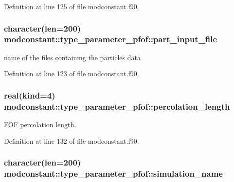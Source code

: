 Definition at line 125 of file modconstant.\+f90.

\subsubsection[{\texorpdfstring{part\+\_\+input\+\_\+file}{part_input_file}}]{\setlength{\rightskip}{0pt plus 5cm}character(len=200) modconstant\+::type\+\_\+parameter\+\_\+pfof\+::part\+\_\+input\+\_\+file}\hypertarget{structmodconstant_1_1type__parameter__pfof_ac6d921f4e7cea83883c15e106de98adf}{}\label{structmodconstant_1_1type__parameter__pfof_ac6d921f4e7cea83883c15e106de98adf}


name of the files containing the particles data 



Definition at line 123 of file modconstant.\+f90.

\subsubsection[{\texorpdfstring{percolation\+\_\+length}{percolation_length}}]{\setlength{\rightskip}{0pt plus 5cm}real(kind=4) modconstant\+::type\+\_\+parameter\+\_\+pfof\+::percolation\+\_\+length}\hypertarget{structmodconstant_1_1type__parameter__pfof_aa62ddf1e2fd4d2d5d5f6fb9381268784}{}\label{structmodconstant_1_1type__parameter__pfof_aa62ddf1e2fd4d2d5d5f6fb9381268784}


F\+OF percolation length. 



Definition at line 132 of file modconstant.\+f90.

\subsubsection[{\texorpdfstring{simulation\+\_\+name}{simulation_name}}]{\setlength{\rightskip}{0pt plus 5cm}character(len=200) modconstant\+::type\+\_\+parameter\+\_\+pfof\+::simulation\+\_\+name}\hypertarget{structmodconstant_1_1type__parameter__pfof_a47ac45f599246d74572f1e8ca85803c0}{}\label{structmodconstant_1_1type__parameter__pfof_a47ac45f599246d74572f1e8ca85803c0}


